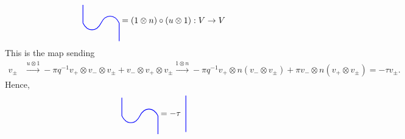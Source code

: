 \documentclass{amsart}
\newcommand{\hackcenter}[1]{
 \xy (0,0)*{#1}; \endxy}
\theoremstyle{plain}
\theoremstyle{definition}
\theoremstyle{definition}
\numberwithin{equation}{section}
\numberwithin{theorem}{section}
\renewcommand{\to}{\rightarrow}
\numberwithin{equation}{section}
\begin{document}
\begin{align*}
    \hackcenter{ \begin{tikzpicture} [xscale=-1, scale=.75]
%
\draw[thick,   blue] (0,0).. controls ++(.25,.5) and ++(-.25,.5).. (1,0);
\draw[thick,   blue] (1,0).. controls ++(.25,-.5) and ++(-.25,-.5).. (2,0);
%
\draw[thick, blue] (2,0) to (2,1);
%
\draw[thick, blue] (0,0) to (0,-1);
\end{tikzpicture}}&=(1\otimes n)\circ (u\otimes 1):V\to V
\end{align*}
This is the map sending
\begin{align*}
  v_{\pm} &\overset{u\otimes 1}{\rightarrow}-\pi q^{-1}v_+\otimes v_- \otimes v_{\pm}+ v_-\otimes v_+\otimes v_{\pm} \overset{1\otimes n}{\rightarrow} -\pi q^{-1}v_+\otimes n(v_- \otimes v_{\pm})+\pi  v_-\otimes n(v_+\otimes v_{\pm})=-\tau v_{\pm}.
\end{align*}
Hence,
\begin{align*}
    \hackcenter{ \begin{tikzpicture} [xscale=-1, scale=.75]
%
\draw[thick,   blue] (0,0).. controls ++(.25,.5) and ++(-.25,.5).. (1,0);
\draw[thick,   blue] (1,0).. controls ++(.25,-.5) and ++(-.25,-.5).. (2,0);
%
\draw[thick, blue] (2,0) to (2,1);
%
\draw[thick, blue] (0,0) to (0,-1);
\end{tikzpicture}}&=-\tau \;\;
\hackcenter{ \begin{tikzpicture} [xscale=-1, scale=.75]
\draw[thick, blue] (1,1) to (1,-1);
\end{tikzpicture}}
\end{align*}
\end{document}
